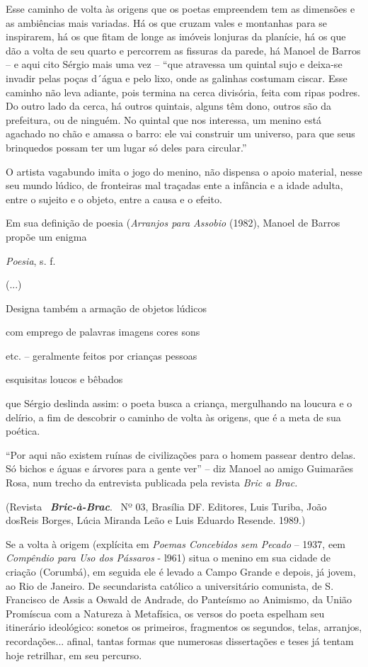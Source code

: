 Esse caminho de volta às origens que os poetas empreendem tem as
dimensões e as ambiências mais variadas. Há os que cruzam vales e
montanhas para se inspirarem, há os que fitam de longe as imóveis
lonjuras da planície, há os que dão a volta de seu quarto e percorrem as
fissuras da parede, há Manoel de Barros -- e aqui cito Sérgio mais uma
vez -- ``que atravessa um quintal sujo e deixa-se invadir pelas poças
d´água e pelo lixo, onde as galinhas costumam ciscar. Esse caminho não
leva adiante, pois termina na cerca divisória, feita com ripas podres.
Do outro lado da cerca, há outros quintais, alguns têm dono, outros são
da prefeitura, ou de ninguém. No quintal que nos interessa, um menino
está agachado no chão e amassa o barro: ele vai construir um universo,
para que seus brinquedos possam ter um lugar só deles para circular.''

O artista vagabundo imita o jogo do menino, não dispensa o apoio
material, nesse seu mundo lúdico, de fronteiras mal traçadas ente a
infância e a idade adulta, entre o sujeito e o objeto, entre a causa e o
efeito.

Em sua definição de poesia (\emph{Arranjos para Assobio} (1982), Manoel
de Barros propõe um enigma

\emph{Poesia}, s. f.

(...)

Designa também a armação de objetos lúdicos

com emprego de palavras imagens cores sons

etc. -- geralmente feitos por crianças pessoas

esquisitas loucos e bêbados

que Sérgio deslinda assim: o poeta busca a criança, mergulhando na
loucura e o delírio, a fim de descobrir o caminho de volta às origens,
que é a meta de sua poética.

``Por aqui não existem ruínas de civilizações para o homem passear
dentro delas. Só bichos e águas e árvores para a gente ver'' -- diz
Manoel ao amigo Guimarães Rosa, num trecho da entrevista publicada pela
revista \emph{Bric a Brac.}

(Revista~ \emph{\textbf{Bric-à-Brac}}.~ Nº 03, Brasília DF. Editores,
Luis Turiba, João dosReis Borges, Lúcia Miranda Leão e Luis Eduardo
Resende. 1989.)

Se a volta à origem (explícita em \emph{Poemas Concebidos sem Pecado} --
1937, eem \emph{Compêndio para Uso dos Pássaros} - l961) situa o menino
em sua cidade de criação (Corumbá), em seguida ele é levado a Campo
Grande e depois, já jovem, ao Rio de Janeiro. De secundarista católico a
universitário comunista, de S. Francisco de Assis a Oswald de Andrade,
do Panteísmo ao Animismo, da União Promíscua com a Natureza à
Metafísica, os versos do poeta espelham seu itinerário ideológico:
sonetos os primeiros, fragmentos os segundos, telas, arranjos,
recordações... afinal, tantas formas que numerosas dissertações e teses
já tentam hoje retrilhar, em seu percurso.

